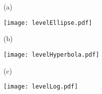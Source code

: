 %

\begin{answer}
(a)
\begin{center}
     \texttt{[image: levelEllipse.pdf]}
\end{center}

(b)
\begin{center}
     \texttt{[image: levelHyperbola.pdf]}
\end{center}

(c)
\begin{center}
     \texttt{[image: levelLog.pdf]}
\end{center}

\end{answer}

